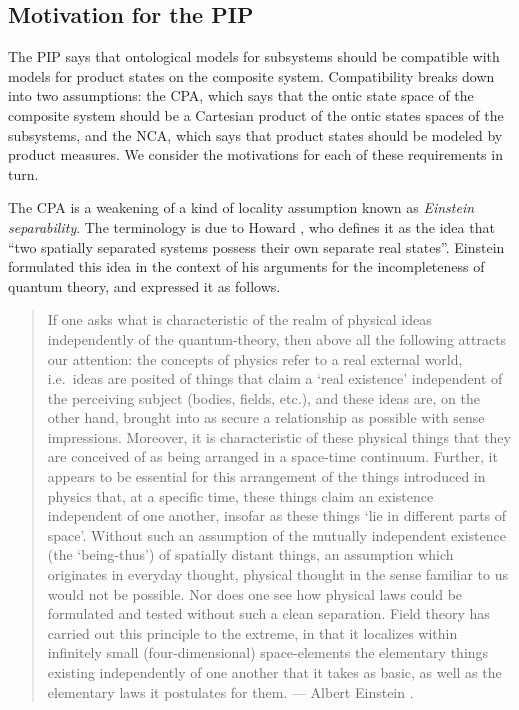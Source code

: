 \documentclass[DIV=calc,fontsize=12pt]{scrartcl} %
\theoremstyle{definition}
\theoremstyle{plain}
\begin{document}
\subsection{Motivation for the PIP}

\label{MPIP}

The PIP says that ontological models for subsystems should be
compatible with models for product states on the composite system.
Compatibility breaks down into two assumptions: the CPA, which says
that the ontic state space of the composite system should be a
Cartesian product of the ontic states spaces of the subsystems, and
the NCA, which says that product states should be modeled by product
measures.  We consider the motivations for each of these requirements
in turn.

The CPA is a weakening of a kind of locality assumption known as
\emph{Einstein separability}.  The terminology is due to Howard
\cite{Howard1985}, who defines it as the idea that ``two spatially
separated systems possess their own separate real states''.  Einstein
formulated this idea in the context of his arguments for the
incompleteness of quantum theory, and expressed it as follows.

\begin{quotation}
If one asks what is characteristic of the realm of physical ideas
independently of the quantum-theory, then above all the following
attracts our attention: the concepts of physics refer to a real
external world, i.e.\ ideas are posited of things that claim a `real
existence' independent of the perceiving subject (bodies, fields,
etc.), and these ideas are, on the other hand, brought into as
secure a relationship as possible with sense impressions.  Moreover,
it is characteristic of these physical things that they are
conceived of as being arranged in a space-time continuum.  Further,
it appears to be essential for this arrangement of the things
introduced in physics that, at a specific time, these things claim
an existence independent of one another, insofar as these things
`lie in different parts of space'.  Without such an assumption of
the mutually independent existence (the `being-thus') of spatially
distant things, an assumption which originates in everyday thought,
physical thought in the sense familiar to us would not be possible.
Nor does one see how physical laws could be formulated and tested
without such a clean separation.  Field theory has carried out this
principle to the extreme, in that it localizes within infinitely
small (four-dimensional) space-elements the elementary things
existing independently of one another that it takes as basic, as
well as the elementary laws it postulates for them.  --- Albert
Einstein \cite{Einstein1948}.
\end{quotation}
\end{document}
